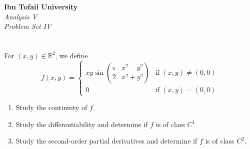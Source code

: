 \documentclass[12pt]{article}
\begin{document}
\begin{center}
\Large\textbf{Ibn Tofail University} \\[1em]
\large\textit{Analysis V} \\[2em]
\large\textit{Problem Set IV} \\[0.5em]
\end{center}

\vspace{1cm}

\section{}
For $(x, y) \in \mathbb{R}^2$, we define
$$f(x, y) = \begin{cases}
xy \sin\left(\dfrac{\pi}{2} \cdot \dfrac{x^2 - y^2}{x^2 + y^2}\right) & \text{if } (x, y) \neq (0, 0) \\[0.5em]
0 & \text{if } (x, y) = (0, 0)
\end{cases}$$

\begin{enumerate}
    \item Study the continuity of $f$.
    \item Study the differentiability and determine if $f$ is of class $C^1$.
    \item Study the second-order partial derivatives and determine if $f$ is of class $C^2$.
\end{enumerate}
\end{document}
